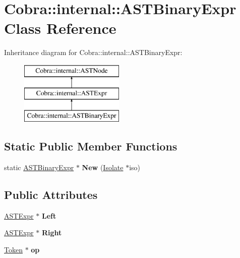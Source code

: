 \hypertarget{class_cobra_1_1internal_1_1_a_s_t_binary_expr}{\section{Cobra\+:\+:internal\+:\+:A\+S\+T\+Binary\+Expr Class Reference}
\label{class_cobra_1_1internal_1_1_a_s_t_binary_expr}
}
Inheritance diagram for Cobra\+:\+:internal\+:\+:A\+S\+T\+Binary\+Expr\+:\begin{figure}[H]
\begin{center}
\leavevmode
\includegraphics[height=3.000000cm]{class_cobra_1_1internal_1_1_a_s_t_binary_expr}
\end{center}
\end{figure}
\subsection*{Static Public Member Functions}
\begin{DoxyCompactItemize}
\item 
\hypertarget{class_cobra_1_1internal_1_1_a_s_t_binary_expr_aec1050f899509111388585c6ad8a4d1d}{static \hyperlink{class_cobra_1_1internal_1_1_a_s_t_binary_expr}{A\+S\+T\+Binary\+Expr} $\ast$ {\bfseries New} (\hyperlink{class_cobra_1_1internal_1_1_isolate}{Isolate} $\ast$iso)}\label{class_cobra_1_1internal_1_1_a_s_t_binary_expr_aec1050f899509111388585c6ad8a4d1d}

\end{DoxyCompactItemize}
\subsection*{Public Attributes}
\begin{DoxyCompactItemize}
\item 
\hypertarget{class_cobra_1_1internal_1_1_a_s_t_binary_expr_aeb1680fce98d2d2b17bf4d8751efea4d}{\hyperlink{class_cobra_1_1internal_1_1_a_s_t_expr}{A\+S\+T\+Expr} $\ast$ {\bfseries Left}}\label{class_cobra_1_1internal_1_1_a_s_t_binary_expr_aeb1680fce98d2d2b17bf4d8751efea4d}

\item 
\hypertarget{class_cobra_1_1internal_1_1_a_s_t_binary_expr_a7b1c52a1e71454681f675401344ea4c9}{\hyperlink{class_cobra_1_1internal_1_1_a_s_t_expr}{A\+S\+T\+Expr} $\ast$ {\bfseries Right}}\label{class_cobra_1_1internal_1_1_a_s_t_binary_expr_a7b1c52a1e71454681f675401344ea4c9}

\item 
\hypertarget{class_cobra_1_1internal_1_1_a_s_t_binary_expr_aa94555a0468455f9ad2d5a7f848d1ef9}{\hyperlink{class_cobra_1_1internal_1_1_token}{Token} $\ast$ {\bfseries op}}\label{class_cobra_1_1internal_1_1_a_s_t_binary_expr_aa94555a0468455f9ad2d5a7f848d1ef9}

\end{DoxyCompactItemize}


